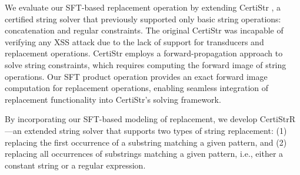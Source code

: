 


We evaluate our SFT-based replacement operation by extending CertiStr \cite{cpp/KanLRS22}, a certified string solver that previously supported only basic string operations: concatenation and regular constraints. The original CertiStr was incapable of verifying any XSS attack due to the lack of support for transducers and replacement operations.
CertiStr employs a forward-propagation approach to solve string constraints, which requires computing the forward image of string operations. Our SFT product operation provides an exact forward image computation for replacement operations, enabling seamless integration of replacement functionality into CertiStr's solving framework.

By incorporating our SFT-based modeling of replacement, we develop CertiStrR—an
extended string solver that supports two types of string replacement: (1)
replacing the first occurrence of a substring matching a given pattern, and (2)
replacing all occurrences of substrings matching a given pattern, i.e., either
a constant string or a regular expression.






%
%

